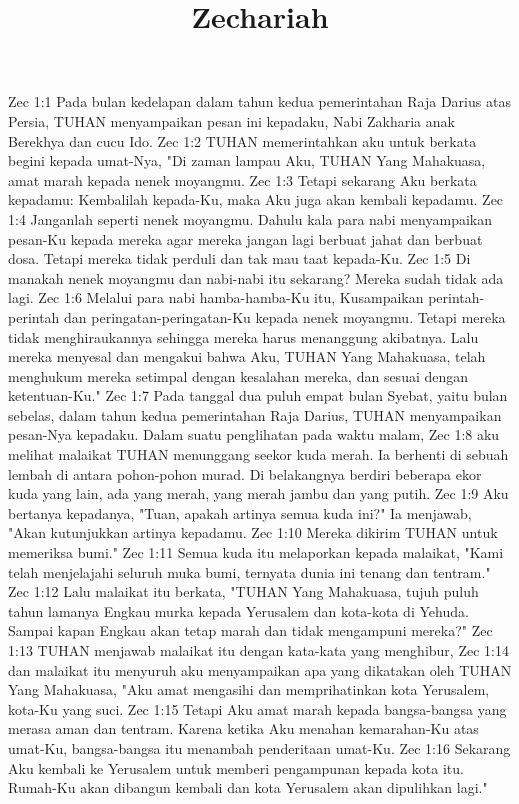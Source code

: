

\title{Zechariah}

Zec 1:1  Pada bulan kedelapan dalam tahun kedua pemerintahan Raja Darius atas Persia, TUHAN menyampaikan pesan ini kepadaku, Nabi Zakharia anak Berekhya dan cucu Ido.
Zec 1:2  TUHAN memerintahkan aku untuk berkata begini kepada umat-Nya, "Di zaman lampau Aku, TUHAN Yang Mahakuasa, amat marah kepada nenek moyangmu.
Zec 1:3  Tetapi sekarang Aku berkata kepadamu: Kembalilah kepada-Ku, maka Aku juga akan kembali kepadamu.
Zec 1:4  Janganlah seperti nenek moyangmu. Dahulu kala para nabi menyampaikan pesan-Ku kepada mereka agar mereka jangan lagi berbuat jahat dan berbuat dosa. Tetapi mereka tidak perduli dan tak mau taat kepada-Ku.
Zec 1:5  Di manakah nenek moyangmu dan nabi-nabi itu sekarang? Mereka sudah tidak ada lagi.
Zec 1:6  Melalui para nabi hamba-hamba-Ku itu, Kusampaikan perintah-perintah dan peringatan-peringatan-Ku kepada nenek moyangmu. Tetapi mereka tidak menghiraukannya sehingga mereka harus menanggung akibatnya. Lalu mereka menyesal dan mengakui bahwa Aku, TUHAN Yang Mahakuasa, telah menghukum mereka setimpal dengan kesalahan mereka, dan sesuai dengan ketentuan-Ku."
Zec 1:7  Pada tanggal dua puluh empat bulan Syebat, yaitu bulan sebelas, dalam tahun kedua pemerintahan Raja Darius, TUHAN menyampaikan pesan-Nya kepadaku. Dalam suatu penglihatan pada waktu malam,
Zec 1:8  aku melihat malaikat TUHAN menunggang seekor kuda merah. Ia berhenti di sebuah lembah di antara pohon-pohon murad. Di belakangnya berdiri beberapa ekor kuda yang lain, ada yang merah, yang merah jambu dan yang putih.
Zec 1:9  Aku bertanya kepadanya, "Tuan, apakah artinya semua kuda ini?" Ia menjawab, "Akan kutunjukkan artinya kepadamu.
Zec 1:10  Mereka dikirim TUHAN untuk memeriksa bumi."
Zec 1:11  Semua kuda itu melaporkan kepada malaikat, "Kami telah menjelajahi seluruh muka bumi, ternyata dunia ini tenang dan tentram."
Zec 1:12  Lalu malaikat itu berkata, "TUHAN Yang Mahakuasa, tujuh puluh tahun lamanya Engkau murka kepada Yerusalem dan kota-kota di Yehuda. Sampai kapan Engkau akan tetap marah dan tidak mengampuni mereka?"
Zec 1:13  TUHAN menjawab malaikat itu dengan kata-kata yang menghibur,
Zec 1:14  dan malaikat itu menyuruh aku menyampaikan apa yang dikatakan oleh TUHAN Yang Mahakuasa, "Aku amat mengasihi dan memprihatinkan kota Yerusalem, kota-Ku yang suci.
Zec 1:15  Tetapi Aku amat marah kepada bangsa-bangsa yang merasa aman dan tentram. Karena ketika Aku menahan kemarahan-Ku atas umat-Ku, bangsa-bangsa itu menambah penderitaan umat-Ku.
Zec 1:16  Sekarang Aku kembali ke Yerusalem untuk memberi pengampunan kepada kota itu. Rumah-Ku akan dibangun kembali dan kota Yerusalem akan dipulihkan lagi."

